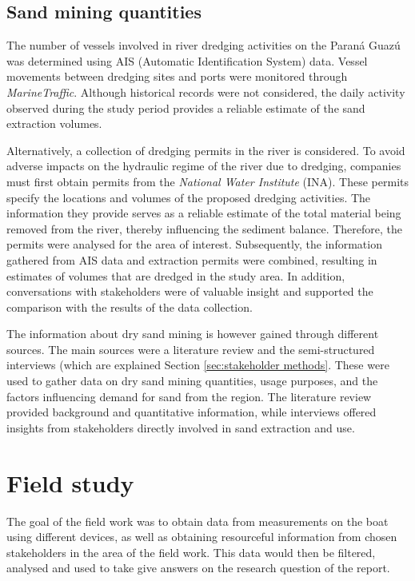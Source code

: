 \subsection{Sand mining quantities}
The number of vessels involved in river dredging activities on the Paraná Guazú was determined using AIS (Automatic Identification System) data. Vessel movements between dredging sites and ports were monitored through \textit{MarineTraffic}. Although historical records were not considered, the daily activity observed during the study period provides a reliable estimate of the sand extraction volumes. 

Alternatively, a collection of dredging permits in the river is considered. To avoid adverse impacts on the hydraulic regime of the river due to dredging, companies must first obtain permits from the \textit{National Water Institute }(INA). These permits specify the locations and volumes of the proposed dredging activities. The information they provide serves as a reliable estimate of the total material being removed from the river, thereby influencing the sediment balance. Therefore, the permits were analysed for the area of interest.
Subsequently, the information gathered from AIS data and extraction permits were combined, resulting in estimates of volumes that are dredged in the study area. In addition, conversations with stakeholders were of valuable insight and supported the comparison with the results of the data collection.

The information about dry sand mining is however gained through different sources. The main sources were a literature review and the semi-structured interviews (which are explained Section \ref{sec:stakeholder methods}. These were used to gather data on dry sand mining quantities, usage purposes, and the factors influencing demand for sand from the region. The literature review provided background and quantitative information, while interviews offered insights from stakeholders directly involved in sand extraction and use.

\section{Field study}
\label{sec:field study}
The goal of the field work was to obtain data from measurements on the boat using different devices, as well as obtaining resourceful information from chosen stakeholders in the area of the field work. This data would then be filtered, analysed and used to take give answers on the research question of the report.

